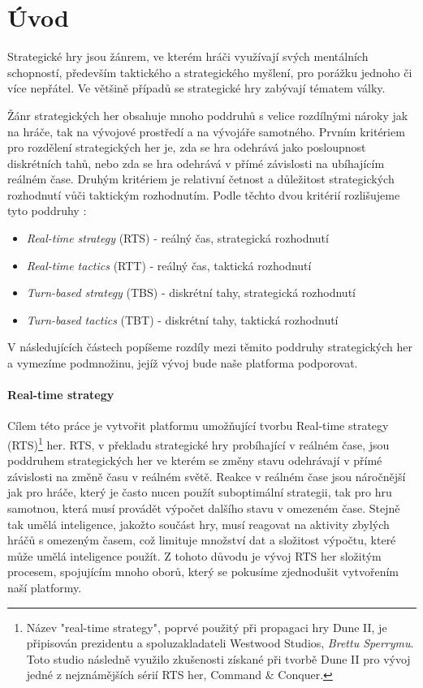 \chapter{Úvod}

Strategické hry jsou žánrem, ve kterém hráči využívají svých mentálních schopností, především taktického a strategického myšlení, pro porážku jednoho či více nepřátel. Ve většině případů se strategické hry zabývají tématem války. \citep{book:gamefund}

Žánr strategických her obsahuje mnoho poddruhů s velice rozdílnými nároky jak na hráče, tak na vývojové prostředí a na vývojáře samotného. Prvním kritériem pro rozdělení strategických her je, zda se hra odehrává jako posloupnost diskrétních tahů, nebo zda se hra odehrává v přímé závislosti na ubíhajícím reálném čase. Druhým kritériem je relativní četnost a důležitost strategických rozhodnutí vůči taktickým rozhodnutím. Podle těchto dvou kritérií rozlišujeme tyto poddruhy \citep{site:stratg05}:
\begin{itemize}
	\item \emph{Real-time strategy} (RTS) - reálný čas, strategická rozhodnutí
	\item \emph{Real-time tactics} (RTT) - reálný čas, taktická rozhodnutí
	\item \emph{Turn-based strategy} (TBS) - diskrétní tahy, strategická rozhodnutí
	\item \emph{Turn-based tactics} (TBT) - diskrétní tahy, taktická rozhodnutí
\end{itemize}

V následujících částech popíšeme rozdíly mezi těmito poddruhy strategických her a vymezíme podmnožinu, jejíž vývoj bude naše platforma podporovat.

\subsubsection{Real-time strategy}
Cílem této práce je vytvořit platformu umožňující tvorbu Real-time strategy (RTS)\footnote{Název "real-time strategy", poprvé použitý při propagaci hry Dune II, je připisován prezidentu a spoluzakladateli Westwood Studios, \emph{Brettu Sperrymu}. Toto studio následně využilo zkušenosti získané při tvorbě Dune II pro vývoj jedné z nejznámějších sérií RTS her, Command \& Conquer.} her. RTS, v překladu strategické hry probíhající v reálném čase, jsou poddruhem strategických her ve kterém se změny stavu odehrávají v přímé závislosti na změně času v reálném světě. Reakce v reálném čase jsou náročnější jak pro hráče, který je často nucen použít suboptimální strategii, tak pro hru samotnou, která musí provádět výpočet dalšího stavu v omezeném čase. Stejně tak umělá inteligence, jakožto součást hry, musí reagovat na aktivity zbylých hráčů s omezeným časem, což limituje množství dat a složitost výpočtu, které může umělá inteligence použít. Z tohoto důvodu je vývoj RTS her složitým procesem, spojujícím mnoho oborů, který se pokusíme zjednodušit vytvořením naší platformy.

